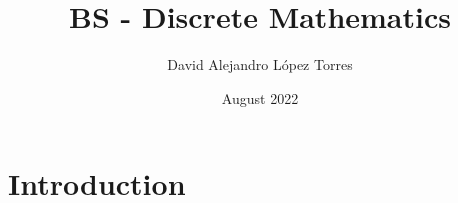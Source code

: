 \documentclass[11pt,letterpaper,spanish]{article}
\title{BS - Discrete Mathematics}
\author{David Alejandro L\'opez Torres}
\date{August 2022}
\theoremstyle{definition}
\begin{document}
\maketitle

\section{Introduction}
\end{document}
